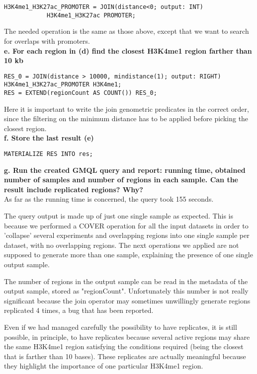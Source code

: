 \documentclass[12pt, a4paper]{article}
\begin{document}
\begin{verbatim}
H3K4me1_H3K27ac_PROMOTER = JOIN(distance<0; output: INT)
            H3K4me1_H3K27ac PROMOTER;
\end{verbatim} 

The needed operation is the same as those above, except that we want to search for overlaps with promoters.\\

\textbf{e. For each region in (d) find the closest H3K4me1 region farther than 10 kb}

\begin{verbatim}
RES_0 = JOIN(distance > 10000, mindistance(1); output: RIGHT)
H3K4me1_H3K27ac_PROMOTER H3K4me1;
RES = EXTEND(regionCount AS COUNT()) RES_0;
\end{verbatim} 

Here it is important to write the join genometric predicates in the correct order, since the filtering on the minimum distance has to be applied before picking the closest region.\\

\textbf{f. Store the last result (e)}

\begin{verbatim}
MATERIALIZE RES INTO res;
\end{verbatim} 

\textbf{g. Run the created GMQL query and report: running time, obtained number of samples and number of regions in each sample. Can the result include replicated regions? Why?}\\

As far as the running time is concerned, the query took 155 seconds.

The query output is made up of just one single sample as expected. This is because we performed a COVER operation for all the input datasets in order to 'collapse' several experiments and overlapping regions into one single sample per dataset, with no overlapping regions. The next operations we applied are not supposed to generate more than one sample, explaining the presence of one single output sample.

The number of regions in the output sample can be read in the metadata of the output sample, stored as "regionCount". Unfortunately this number is not really significant because the join operator may sometimes unwillingly generate regions replicated 4 times, a bug that has been reported.

Even if we had managed carefully the possibility to have replicates, it is still possible, in principle, to have replicates because several active regions may share the same H3K4me1 region satisfying the conditions required (being the closest that is farther than 10 bases). These replicates are actually meaningful because they highlight the importance of one particular H3K4me1 region.
\end{document}
